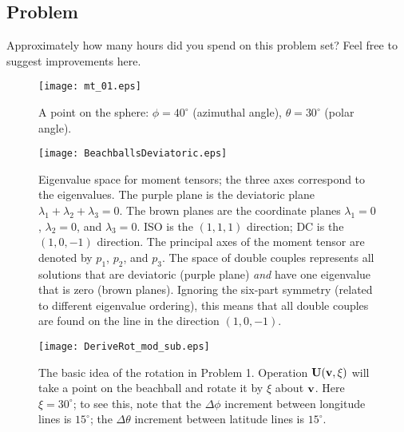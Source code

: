 \documentclass[11pt,titlepage,fleqn]{article}
\newcommand{\rotangB}{\xi}    %
\newcommand{\rotvec}{\bv}      %
\begin{document}

\subsection*{Problem}

Approximately how many hours did you spend on this problem set? Feel free to suggest improvements here.




\begin{figure}[h]
\centering
\texttt{[image: mt\_01.eps]}
\caption[]
{{
A point on the sphere: $\phi = 40^\circ$ (azimuthal angle), $\theta = 30^\circ$ (polar angle).
\label{fig:globe}
}}
\end{figure}

\clearpage\pagebreak
\begin{figure}
\centering
\texttt{[image: BeachballsDeviatoric.eps]}
\caption[]
{{
Eigenvalue space for moment tensors; the three axes correspond to the eigenvalues.
The purple plane is the deviatoric plane $\lambda_1 + \lambda_2 + \lambda_3 = 0$.
The brown planes are the coordinate planes $\lambda_1 = 0$, $\lambda_2 = 0$, and $\lambda_3 = 0$.
ISO is the $(1,1,1)$ direction; DC is the $(1,0,-1)$ direction.
The principal axes of the moment tensor are denoted by $p_1$, $p_2$, and $p_3$.
 The space of double couples represents all solutions that are deviatoric (purple plane) {\em and} have one eigenvalue that is zero (brown planes). Ignoring the six-part symmetry (related to different eigenvalue ordering), this means that all double couples are found on the line in the direction $(1,0,-1)$.
\label{fig:lam}
}}
\end{figure}

\begin{figure}
\centering
\texttt{[image: DeriveRot\_mod\_sub.eps]}
\caption[]
{{
The basic idea of the rotation in Problem 1.
Operation $\bU(\rotvec,\rotangB)$ will take a point on the beachball and rotate it by $\rotangB$ about $\rotvec$.
Here $\rotangB = 30^\circ$; to see this, note that the $\Delta\phi$ increment between longitude lines is $15^\circ$; the $\Delta\theta$ increment between latitude lines is $15^\circ$.
\label{fig:rotsub}
}}
\end{figure}
\end{document}
